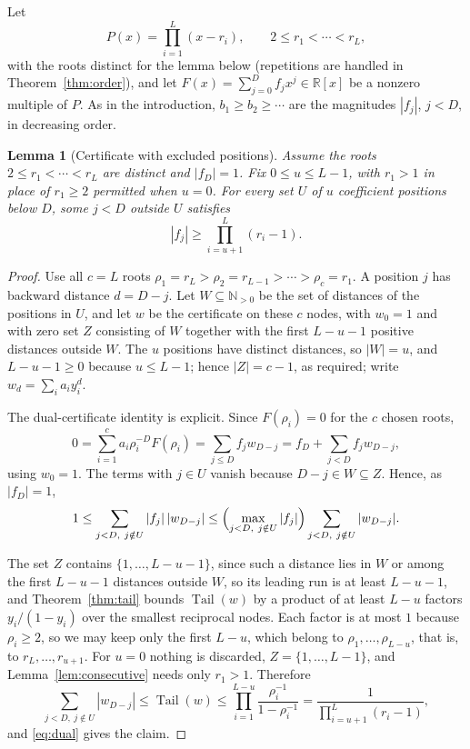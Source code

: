 \documentclass[11pt]{article}
\newtheorem{lemma}[theorem]{Lemma}
\newcommand{\R}{\mathbb R}
\newcommand{\N}{\mathbb N}
\DeclareMathOperator{\Tail}{Tail}
\begin{document}
Let
\[
 P(x)=\prod_{i=1}^L(x-r_i),\qquad 2\le r_1<\cdots<r_L,
\]
with the roots distinct for the lemma below (repetitions are handled in
Theorem~\ref{thm:order}), and let $F(x)=\sum_{j=0}^Df_jx^j\in\R[x]$ be a
nonzero multiple of $P$.  As in the introduction, $b_1\ge b_2\ge\cdots$ are
the magnitudes $|f_j|$, $j<D$, in decreasing order.

\begin{lemma}[Certificate with excluded positions]\label{lem:slack}
Assume the roots $2\le r_1<\cdots<r_L$ are distinct and $|f_D|=1$.  Fix $0\le u\le L-1$, with $r_1>1$
in place of $r_1\ge2$ permitted when $u=0$.  For every set $U$ of $u$
coefficient positions below $D$, some $j<D$ outside $U$ satisfies
\[
 |f_j|\ge\prod_{i=u+1}^L(r_i-1).
\]
\end{lemma}

\begin{proof}
Use all $c=L$ roots $\rho_1=r_L>\rho_2=r_{L-1}>\cdots>\rho_c=r_1$.  A
position $j$ has backward distance $d=D-j$.  Let $W\subseteq\N_{>0}$ be the
set of distances of the positions in $U$, and let $w$ be the certificate on
these $c$ nodes, with $w_0=1$ and with zero set $Z$ consisting of $W$
together with the first $L-u-1$ positive distances outside $W$.  The $u$
positions have distinct distances, so $|W|=u$, and $L-u-1\ge0$ because
$u\le L-1$; hence $|Z|=c-1$, as required; write $w_d=\sum_i a_iy_i^d$.

The dual-certificate identity is explicit.  Since $F(\rho_i)=0$ for the $c$
chosen roots,
\[
  0=\sum_{i=1}^c a_i\rho_i^{-D}F(\rho_i)
   =\sum_{j\le D}f_jw_{D-j}
   =f_D+\sum_{j<D}f_jw_{D-j},
\]
using $w_0=1$.  The terms with $j\in U$ vanish because $D-j\in W\subseteq Z$.
Hence, as $|f_D|=1$,
\begin{equation}\label{eq:dual}
  1\le\sum_{j<D,\ j\notin U}|f_j|\,|w_{D-j}|
  \le\Bigl(\max_{j<D,\ j\notin U}|f_j|\Bigr)
        \sum_{j<D,\ j\notin U}|w_{D-j}|.
\end{equation}

The set $Z$ contains $\{1,\ldots,L-u-1\}$, since such a distance lies in $W$
or among the first $L-u-1$ distances outside $W$, so its leading run is at least
$L-u-1$, and Theorem~\ref{thm:tail} bounds $\Tail(w)$ by a product of at
least $L-u$ factors $y_i/(1-y_i)$ over the smallest reciprocal nodes.  Each
factor is at most $1$ because $\rho_i\ge2$, so we may keep only the first
$L-u$, which belong to $\rho_1,\ldots,\rho_{L-u}$, that is, to
$r_L,\ldots,r_{u+1}$.  For $u=0$ nothing is discarded, $Z=\{1,\ldots,L-1\}$,
and Lemma~\ref{lem:consecutive} needs only $r_1>1$.  Therefore
\[
  \sum_{j<D,\ j\notin U}|w_{D-j}|
  \le\Tail(w)
  \le\prod_{i=1}^{L-u}\frac{\rho_i^{-1}}{1-\rho_i^{-1}}
  =\frac{1}{\prod_{i=u+1}^L(r_i-1)},
\]
and \eqref{eq:dual} gives the claim.
\end{proof}
\end{document}
